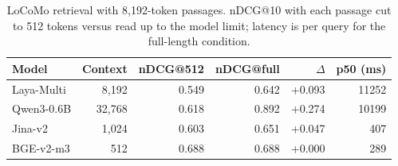 \begin{table}[t]
\centering
\small
\caption{LoCoMo retrieval with 8,192-token passages. nDCG@10 with each passage cut to 512 tokens versus read up to the model limit; latency is per query for the full-length condition.}
\label{tab:longcontext}
\begin{tabular}{lrrrrr}
\toprule
Model & Context & nDCG@512 & nDCG@full & $\Delta$ & p50 (ms) \\
\midrule
Laya-Multi & 8,192 & 0.549 & 0.642 & +0.093 & 11252 \\
Qwen3-0.6B & 32,768 & 0.618 & 0.892 & +0.274 & 10199 \\
Jina-v2 & 1,024 & 0.603 & 0.651 & +0.047 & 407 \\
BGE-v2-m3 & 512 & 0.688 & 0.688 & +0.000 & 289 \\
\bottomrule
\end{tabular}
\end{table}
